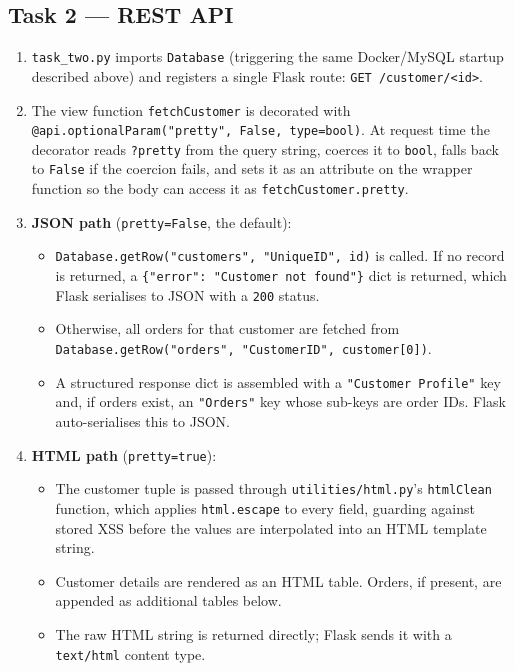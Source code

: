 \documentclass[12pt,a4paper]{article}
\begin{document}
\subsection{Task 2 --- REST API}

\begin{enumerate}[leftmargin=2em]
    \item \texttt{task\_two.py} imports \texttt{Database} (triggering the same
          Docker/MySQL startup described above) and registers a single Flask
          route: \texttt{GET /customer/<id>}.

    \item The view function \texttt{fetchCustomer} is decorated with
          \texttt{@api.optionalParam("pretty", False, type=bool)}.
          At request time the decorator reads \texttt{?pretty} from the query
          string, coerces it to \texttt{bool}, falls back to \texttt{False} if
          the coercion fails, and sets it as an attribute on the wrapper
          function so the body can access it as \texttt{fetchCustomer.pretty}.

    \item \textbf{JSON path} (\texttt{pretty=False}, the default):
          \begin{itemize}
              \item \texttt{Database.getRow("customers", "UniqueID", id)} is
                    called. If no record is returned, a \texttt{\{"error": "Customer not found"\}}
                    dict is returned, which Flask serialises to JSON with a
                    \texttt{200} status.
              \item Otherwise, all orders for that customer are fetched from
                    \texttt{Database.getRow("orders", "CustomerID", customer[0])}.
              \item A structured response dict is assembled with a
                    \texttt{"Customer Profile"} key and, if orders exist, an
                    \texttt{"Orders"} key whose sub-keys are order IDs. Flask
                    auto-serialises this to JSON.
          \end{itemize}

    \item \textbf{HTML path} (\texttt{pretty=true}):
          \begin{itemize}
              \item The customer tuple is passed through
                    \texttt{utilities/html.py}'s \texttt{htmlClean} function,
                    which applies \texttt{html.escape} to every field, guarding
                    against stored XSS before the values are interpolated into
                    an HTML template string.
              \item Customer details are rendered as an HTML table. Orders, if
                    present, are appended as additional tables below.
              \item The raw HTML string is returned directly; Flask sends it
                    with a \texttt{text/html} content type.
          \end{itemize}


\end{enumerate}
\end{document}
